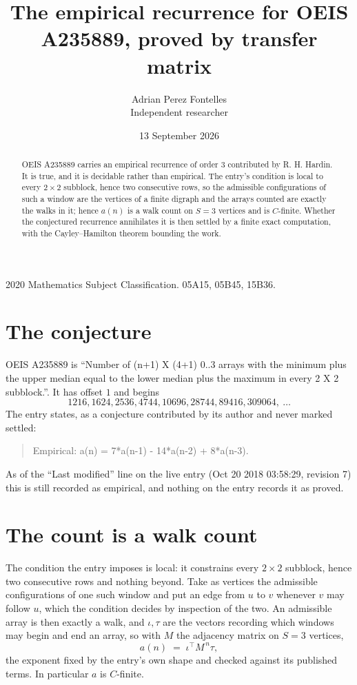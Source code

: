\documentclass[11pt,a4paper]{article}
\title{The empirical recurrence for OEIS A235889, proved by transfer matrix}
\author{Adrian Perez Fontelles\\ \small Independent researcher}
\date{13 September 2026}
\theoremstyle{plain}
\theoremstyle{definition}
\begin{document}
\maketitle

\begin{abstract}
OEIS A235889 carries an empirical recurrence of order $3$ contributed by R. H. Hardin. It is
true, and it is decidable rather than empirical. The entry's condition is local to every $2\times2$ subblock, hence two consecutive rows, so
the admissible configurations of such a window are the vertices of a finite digraph and the
arrays counted are exactly the walks in it; hence $a(n)$ is a walk count on $S=3$ vertices
and is $C$-finite. Whether the conjectured recurrence annihilates it is then settled by a
finite exact computation, with the Cayley--Hamilton theorem bounding the work.
\end{abstract}

\noindent\small 2020 Mathematics Subject Classification. 05A15, 05B45, 15B36.\normalsize

\section{The conjecture}

OEIS A235889 is ``Number of (n+1) X (4+1) 0..3 arrays with the minimum plus the upper median equal to the lower median plus the maximum in every 2 X 2 subblock.''. It has offset $1$ and begins
\[
1216, 1624, 2536, 4744, 10696, 28744, 89416, 309064,\ \dots
\]
The entry states, as a conjecture contributed by its author and never marked settled:
\begin{quote}
Empirical: a(n) = 7*a(n-1) - 14*a(n-2) + 8*a(n-3).
\end{quote}
As of the ``Last modified'' line on the live entry (Oct 20 2018 03:58:29, revision 7) this is still
recorded as empirical, and nothing on the entry records it as proved.

\section{The count is a walk count}

The condition the entry imposes is local: it constrains every $2\times2$ subblock, hence two consecutive rows and nothing beyond. Take as vertices the admissible configurations of one such window and put an edge from $u$ to $v$ whenever $v$ may follow $u$, which the condition decides by inspection of the two.
An admissible array is then exactly a walk, and $\iota,\tau$ are the vectors recording which windows may begin and end an array, so with $M$ the adjacency matrix on $S=3$ vertices,
\[
a(n)\;=\;\iota^{\!\top}M^{\,n}\tau ,
\]
the exponent fixed by the entry's own shape and checked against its published terms. In
particular $a$ is $C$-finite.
\end{document}
